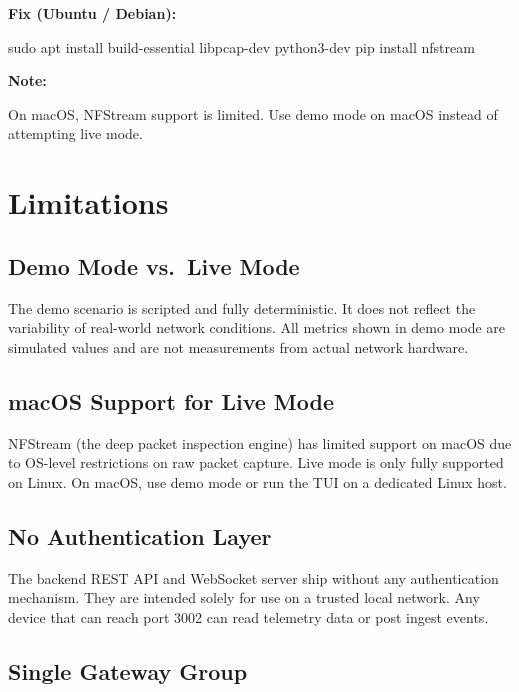\documentclass[11pt, a4paper]{article}
\newenvironment{notebox}{%
  \begin{tcolorbox}[
    colback=noteblue, colframe=noteblueborder,
    arc=4pt, boxrule=1.5pt,
    left=10pt, right=10pt, top=7pt, bottom=7pt,
    fontupper=\small, breakable
  ]\textbf{\color{noteblueborder}Note:}\enspace
}{%
  \end{tcolorbox}\vspace{0.3em}
}
\begin{document}
\textbf{Fix (Ubuntu / Debian):}
\begin{codebox}[bash]
sudo apt install build-essential libpcap-dev python3-dev
pip install nfstream
\end{codebox}

\begin{notebox}
On macOS, NFStream support is limited. Use demo mode on macOS instead of attempting live mode.
\end{notebox}

\section{Limitations}

\subsection{Demo Mode vs.\ Live Mode}

The demo scenario is scripted and fully deterministic. It does not reflect the variability of real-world network conditions. All metrics shown in demo mode are simulated values and are not measurements from actual network hardware.

\subsection{macOS Support for Live Mode}

NFStream (the deep packet inspection engine) has limited support on macOS due to OS-level restrictions on raw packet capture. Live mode is only fully supported on Linux. On macOS, use demo mode or run the TUI on a dedicated Linux host.

\subsection{No Authentication Layer}

The backend REST API and WebSocket server ship without any authentication mechanism. They are intended solely for use on a trusted local network. Any device that can reach port 3002 can read telemetry data or post ingest events.

\subsection{Single Gateway Group}
\end{document}

